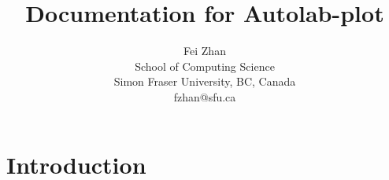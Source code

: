 \documentclass{article}
\begin{document}
\title{Documentation for Autolab-plot}
\author{Fei Zhan \\ School of Computing Science \\ Simon Fraser University, BC, Canada \\ fzhan@sfu.ca}
\maketitle

\section{Introduction}




\end{document}
